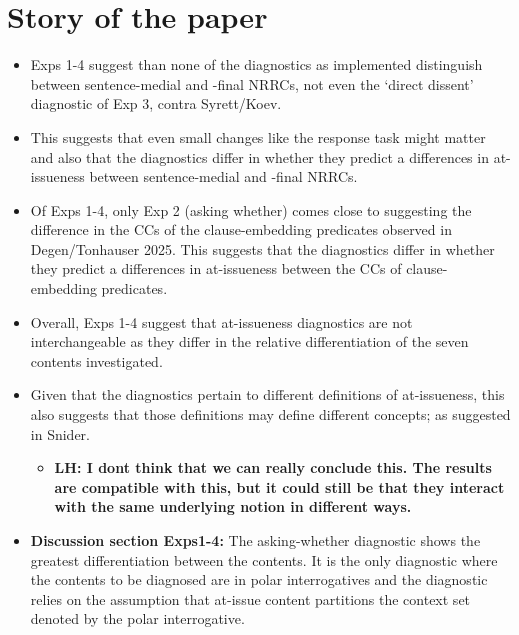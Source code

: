 \documentclass[times,linguex,xcolor]{glossa}
\newcommand{\lh}[1]{\textbf{\color{Cerulean}LH: #1}}
\begin{document}
  
\newpage

\section*{Story of the paper}

  \begin{itemize}[leftmargin=12pt]

    \item Exps 1-4 suggest than none of the diagnostics as implemented distinguish between sentence-medial and -final NRRCs, not even the `direct dissent' diagnostic of Exp 3, contra Syrett/Koev. 

    \item This suggests that even small changes like the response task might matter and also that the diagnostics differ in whether they predict a differences in at-issueness between sentence-medial and -final NRRCs.

    \item Of Exps 1-4, only Exp 2 (asking whether) comes close to suggesting the difference in the CCs of the clause-embedding predicates observed in Degen/Tonhauser 2025. This suggests that the diagnostics differ in whether they predict a differences in at-issueness between the CCs of clause-embedding predicates.

    \item Overall, Exps 1-4 suggest that at-issueness diagnostics are not interchangeable as they differ in the relative differentiation of the seven contents investigated. 

    \item Given that the diagnostics pertain to different definitions of at-issueness, this also suggests that those definitions may define different concepts; as suggested in Snider.
    \begin{itemize}
      \item \lh{I dont think that we can really conclude this. The results are compatible with this, but it could still be that they interact with the same underlying notion in different ways.}
    \end{itemize}

    \item {\bf Discussion section Exps1-4:} The asking-whether diagnostic shows the greatest differentiation between the contents.  It is the only diagnostic where the contents to be diagnosed are in polar interrogatives and the diagnostic relies on the assumption that at-issue content partitions the context set denoted by the polar interrogative.


\end{itemize}
\end{document}
